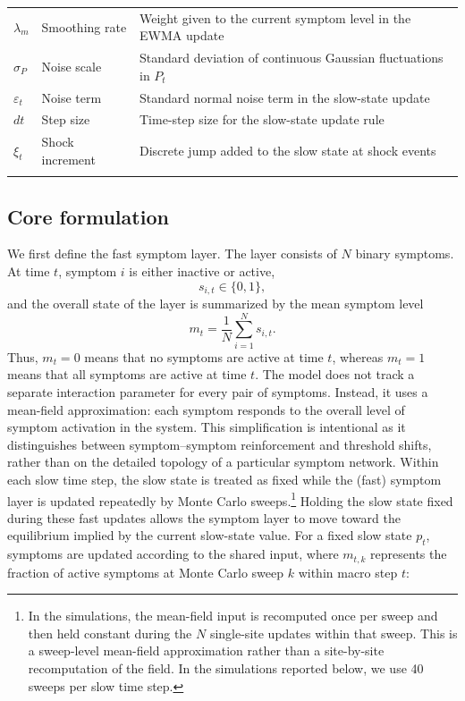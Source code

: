 \documentclass[man,12pt,floatsintext]{apa7}
\begin{document}
\begin{table}[htbp]
\begin{tabularx}{\linewidth}{@{} l l X @{}}
\(\lambda_m\) & Smoothing rate & Weight given to the current symptom level in the EWMA update \\
\(\sigma_P\) & Noise scale & Standard deviation of continuous Gaussian fluctuations in \(P_t\) \\
\(\varepsilon_t\) & Noise term & Standard normal noise term in the slow-state update \\
\(dt\) & Step size & Time-step size for the slow-state update rule \\
\(\xi_t\) & Shock increment & Discrete jump added to the slow state at shock events \\
\arrayrulecolor{black}\bottomrule
\end{tabularx}
\end{table}
\subsection{Core formulation}
We first define the fast symptom layer. The layer consists of \(N\) binary symptoms. At time \(t\), symptom \(i\) is either inactive or active,
\[
s_{i,t}\in\{0,1\},
\]
and the overall state of the layer is summarized by the mean symptom level
\[
m_t=\frac{1}{N}\sum_{i=1}^N s_{i,t}.
\]
Thus, \(m_t=0\) means that no symptoms are active at time $t$, whereas \(m_t=1\) means that all symptoms are active at time $t$. The model does not track a separate interaction parameter for every pair of symptoms. Instead, it uses a mean-field approximation: each symptom responds to the overall level of symptom activation in the system. This simplification is intentional as it  distinguishes between symptom--symptom reinforcement and threshold shifts, rather than on the detailed topology of a particular symptom network.
Within each slow time step, the slow state is treated as fixed while the (fast) symptom layer is updated repeatedly by Monte Carlo sweeps.\footnote{In the simulations, the mean-field input is recomputed once per sweep and then held constant during the \(N\) single-site updates within that sweep. This is a sweep-level mean-field approximation rather than a site-by-site recomputation of the field. In the simulations reported below, we use 40 sweeps per slow time step.} Holding the slow state fixed during these fast updates allows the symptom layer to move toward the equilibrium implied by the current slow-state value.
For a fixed slow state \(p_t\), symptoms are updated according to the shared input, where \(m_{t,k}\) represents the fraction of active symptoms at Monte Carlo sweep \(k\) within macro step \(t\):
\end{document}
